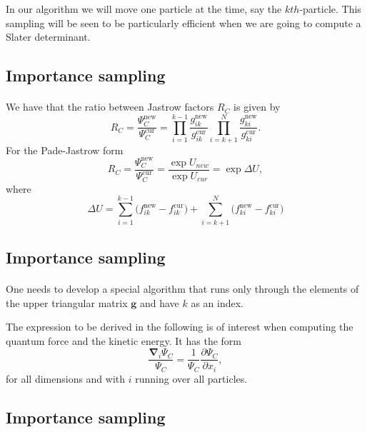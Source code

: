 \documentclass[%
twoside,                 %
final,                   %
10pt]{article}
\begin{document}
In our algorithm we will move one particle  at the time, say the $kth$-particle.  This sampling will be seen to be particularly efficient when we are going to compute a Slater determinant.


\subsection*{Importance sampling}

\paragraph{}
We have that the ratio between Jastrow factors $R_C$ is given by
\[
R_{C} = \frac{\Psi_{C}^\mathrm{new}}{\Psi_{C}^\mathrm{cur}} =
\prod_{i=1}^{k-1}\frac{g_{ik}^\mathrm{new}}{g_{ik}^\mathrm{cur}}
\prod_{i=k+1}^{N}\frac{ g_{ki}^\mathrm{new}} {g_{ki}^\mathrm{cur}}.
\]
For the Pade-Jastrow form
\[
 R_{C} = \frac{\Psi_{C}^\mathrm{new}}{\Psi_{C}^\mathrm{cur}} = 
\frac{\exp{U_{new}}}{\exp{U_{cur}}} = \exp{\Delta U},
\]
where
\[
\Delta U =
\sum_{i=1}^{k-1}\big(f_{ik}^\mathrm{new}-f_{ik}^\mathrm{cur}\big)
+
\sum_{i=k+1}^{N}\big(f_{ki}^\mathrm{new}-f_{ki}^\mathrm{cur}\big)
\]




\subsection*{Importance sampling}

\paragraph{}
One needs to develop a special algorithm 
that runs only through the elements of the upper triangular
matrix $\mathbf{g}$ and have $k$ as an index. 

The expression to be derived in the following is of interest when computing the quantum force and the kinetic energy. It has the form
\[
\frac{\mathbf{\nabla}_i\Psi_C}{\Psi_C} = \frac{1}{\Psi_C}\frac{\partial \Psi_C}{\partial x_i},
\]
for all dimensions and with $i$ running over all particles.


\subsection*{Importance sampling}
\end{document}
